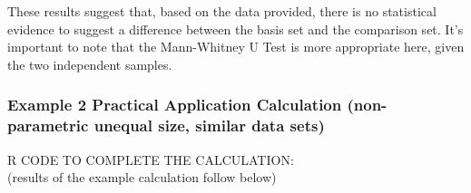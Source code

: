 \documentclass[
  12pt,
  a4paper,
]{article}
\numberwithin{equation}{section}
\theoremstyle{plain}
\theoremstyle{definition}
\theoremstyle{remark}
\theoremstyle{note}
\begin{document}
These results suggest that, based on the data provided, there is no
statistical evidence to suggest a difference between the basis set and
the comparison set. It's important to note that the Mann-Whitney U Test
is more appropriate here, given the two independent samples.

\newpage

\hypertarget{example-2-practical-application-calculation-non-parametric-unequal-size-similar-data-sets}{%
\subsubsection{Example 2 Practical Application Calculation
(non-parametric unequal size, similar data
sets)}\label{example-2-practical-application-calculation-non-parametric-unequal-size-similar-data-sets}}

R CODE TO COMPLETE THE CALCULATION:\\
(results of the example calculation follow below)
\end{document}
